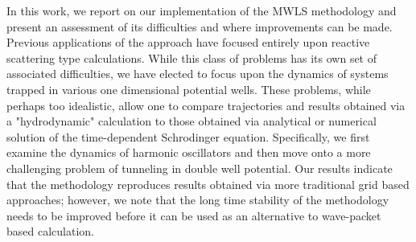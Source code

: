 In this work, we report on our implementation of the MWLS methodology 
and present an assessment of its difficulties and where improvements 
can be made.  Previous applications of the approach have focused 
entirely upon reactive scattering type calculations.  While this class 
of problems has its own set of associated difficulties, we have 
elected to focus upon the dynamics of systems trapped in various one 
dimensional potential wells.  These problems, while perhaps too 
idealistic, allow one to compare trajectories and results obtained via 
a "hydrodynamic" calculation to those obtained via analytical or 
numerical solution of the time-dependent Schrodinger equation.  
Specifically, we first examine the dynamics of harmonic oscillators 
and then move onto a more challenging problem of tunneling in double 
well potential.  Our results indicate that the methodology reproduces 
results obtained via more traditional grid based approaches; however, 
we note that the long time stability of the methodology needs to be 
improved before it can be used as an alternative to wave-packet based 
calculation.


